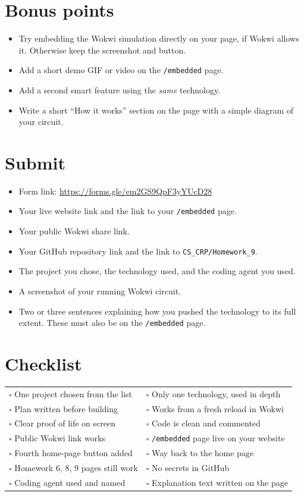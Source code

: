 \documentclass[11pt,a4paper]{article}
\begin{document}
\section*{Bonus points}
\begin{itemize}
\item Try embedding the Wokwi simulation directly on your page, if Wokwi allows it. Otherwise keep the screenshot and button.
\item Add a short demo GIF or video on the \texttt{/embedded} page.
\item Add a second smart feature using the \emph{same} technology.
\item Write a short ``How it works'' section on the page with a simple diagram of your circuit.
\end{itemize}

\section*{Submit}
\begin{itemize}
\item Form link: \url{https://forms.gle/em2GS9QpF3yYUcD28}
\item Your live website link and the link to your \texttt{/embedded} page.
\item Your public Wokwi share link.
\item Your GitHub repository link and the link to \texttt{CS\_CRP/Homework\_9}.
\item The project you chose, the technology used, and the coding agent you used.
\item A screenshot of your running Wokwi circuit.
\item Two or three sentences explaining how you pushed the technology to its full extent. These must also be on the \texttt{/embedded} page.
\end{itemize}

\section*{Checklist}
\begin{center}
\begin{tabularx}{\textwidth}{XX}
$\square$ One project chosen from the list & $\square$ Only one technology, used in depth\\
$\square$ Plan written before building & $\square$ Works from a fresh reload in Wokwi\\
$\square$ Clear proof of life on screen & $\square$ Code is clean and commented\\
$\square$ Public Wokwi link works & $\square$ \texttt{/embedded} page live on your website\\
$\square$ Fourth home-page button added & $\square$ Way back to the home page\\
$\square$ Homework 6, 8, 9 pages still work & $\square$ No secrets in GitHub\\
$\square$ Coding agent used and named & $\square$ Explanation text written on the page\\
\end{tabularx}
\end{center}
\end{document}

